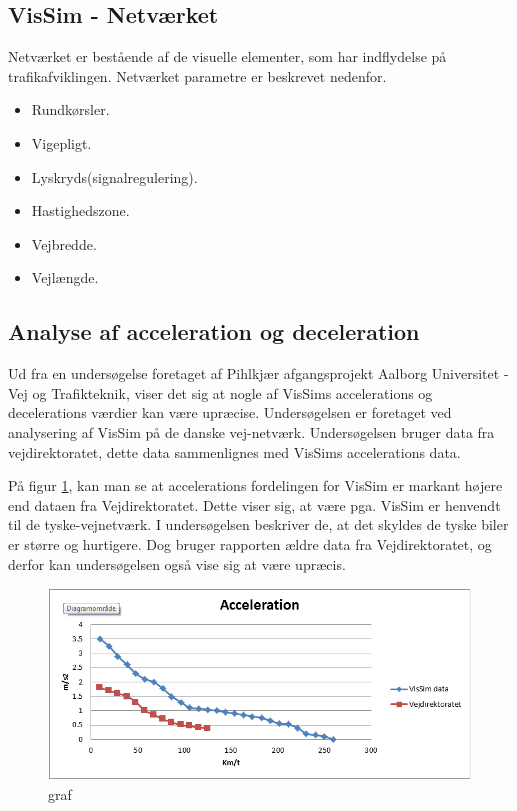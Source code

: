 \subsection{VisSim - Netværket}
Netværket er bestående af de visuelle elementer, som har indflydelse på trafikafviklingen.
Netværket parametre er beskrevet nedenfor.

\begin{itemize}
\item Rundkørsler.
\item Vigepligt.
\item Lyskryds(signalregulering).
\item Hastighedszone.
\item Vejbredde.
\item Vejlængde.
\end{itemize}

\subsection{Analyse af acceleration og deceleration}
Ud fra en undersøgelse foretaget af Pihlkjær afgangsprojekt Aalborg Universitet - Vej og Trafikteknik, viser det sig at nogle af VisSims accelerations og decelerations værdier kan være upræcise. Undersøgelsen er foretaget ved analysering af VisSim på de danske vej-netværk.  Undersøgelsen bruger data fra vejdirektoratet, dette data sammenlignes med VisSims accelerations data.

På figur \ref{GrafForAccelerationVisSim}, kan man se at accelerations fordelingen for VisSim er markant højere end dataen fra Vejdirektoratet. Dette viser sig, at være pga. VisSim er henvendt til de tyske-vejnetværk. I undersøgelsen beskriver de, at det skyldes de tyske biler er større og hurtigere. Dog bruger rapporten ældre data fra Vejdirektoratet, og derfor kan undersøgelsen også vise sig at være upræcis.

\begin{figure}
\begin{center}
\includegraphics[width=1.0\textwidth]{Pictures/Teknologianalyse/GrafForAccelerationVisSim.png}
\end{center}
\label{GrafForAccelerationVisSim}
\caption{graf}
\end{figure}

